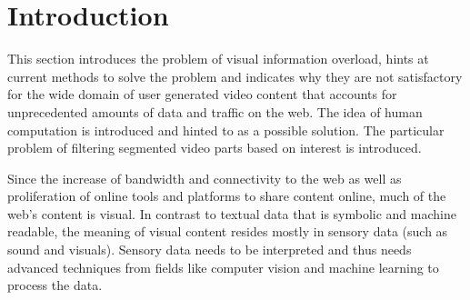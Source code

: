 \chapter{Introduction}
\label{ch:introduction}

This section introduces the problem of visual information overload, hints at current methods to solve the problem and indicates why they are not satisfactory for the wide domain of user generated video content that accounts for unprecedented amounts of data and traffic on the web. The idea of human computation is introduced and hinted to as a possible solution. The particular problem of filtering segmented video parts based on interest is introduced.

Since the increase of bandwidth and connectivity to the web as well as proliferation of online tools and platforms to share content online, much of the web's content is visual. In contrast to textual data that is symbolic and machine readable, the meaning of visual content resides mostly in sensory data (such as sound and visuals). Sensory data needs to be interpreted and thus needs advanced techniques from fields like computer vision and machine learning to process the data.






